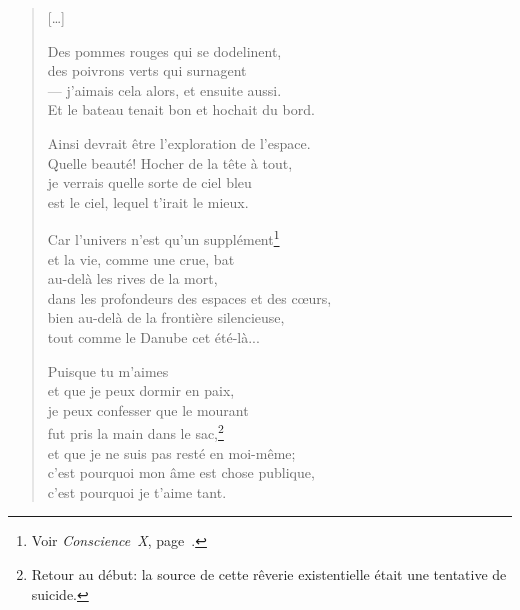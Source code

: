 \documentclass[11pt]{book}
\newcommand*{\centeredornament}{\centerline{\pgfornament[width=6cm]{88}}}
\begin{document}
\begin{verse}
  \textnormal{[\ldots]}

  Des pommes rouges qui se dodelinent, \\
  des poivrons verts qui surnagent \\
  --- j'aimais cela alors, et ensuite aussi. \\
  Et le bateau tenait bon et hochait du bord.

  Ainsi devrait être l'exploration de l'espace. \\
  Quelle beauté! Hocher de la tête à tout, \\
  je verrais quelle sorte de ciel bleu \\
  est le ciel, lequel t'irait le mieux.

  Car l'univers n'est qu'un supplément\footnote{Voir
  \emph{Conscience~X}, page~\pageref{conscience_X}.} \\
  et la vie, comme une crue, bat \\
  au-delà les rives de la mort, \\
  dans les profondeurs des espaces et des cœurs,\hspace*{-1mm} \\
  bien au-delà de la frontière silencieuse, \\
  tout comme le Danube cet été-là...

  Puisque tu m'aimes \\
  et que je peux dormir en paix, \\
  je peux confesser que le mourant \\
  fut pris la main dans le sac,\footnote{Retour au début: la source de
  cette rêverie existentielle était une tentative de suicide.} \\
  et que je ne suis pas resté en moi-même; \\
  c'est pourquoi mon âme est chose publique,\hspace*{-1mm} \\
  c'est pourquoi je t'aime tant.
\end{verse}

\newpage

\vspace*{-15mm}
\centeredornament


\end{document}
